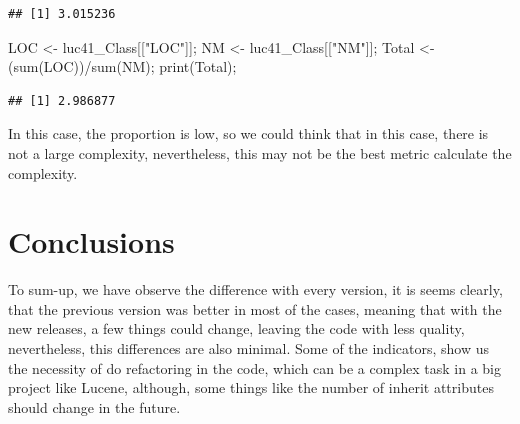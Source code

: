\documentclass[
]{article}
\newenvironment{Shaded}{\begin{snugshade}}{\end{snugshade}}
\newcommand{\FunctionTok}[1]{\textcolor[rgb]{0.00,0.00,0.00}{#1}}
\newcommand{\NormalTok}[1]{#1}
\newcommand{\OtherTok}[1]{\textcolor[rgb]{0.56,0.35,0.01}{#1}}
\newcommand{\SpecialCharTok}[1]{\textcolor[rgb]{0.00,0.00,0.00}{#1}}
\newcommand{\StringTok}[1]{\textcolor[rgb]{0.31,0.60,0.02}{#1}}
\begin{document}
\begin{verbatim}
## [1] 3.015236
\end{verbatim}

\begin{Shaded}
\begin{Highlighting}[]
\NormalTok{LOC }\OtherTok{\textless{}{-}}\NormalTok{ luc41\_Class[[}\StringTok{"LOC"}\NormalTok{]];}
\NormalTok{NM }\OtherTok{\textless{}{-}}\NormalTok{ luc41\_Class[[}\StringTok{"NM"}\NormalTok{]];}
\NormalTok{Total }\OtherTok{\textless{}{-}}\NormalTok{ (}\FunctionTok{sum}\NormalTok{(LOC))}\SpecialCharTok{/}\FunctionTok{sum}\NormalTok{(NM);}
\FunctionTok{print}\NormalTok{(Total);}
\end{Highlighting}
\end{Shaded}

\begin{verbatim}
## [1] 2.986877
\end{verbatim}

In this case, the proportion is low, so we could think that in this
case, there is not a large complexity, nevertheless, this may not be the
best metric calculate the complexity.

\hypertarget{conclusions}{%
\section{Conclusions}\label{conclusions}}

To sum-up, we have observe the difference with every version, it is
seems clearly, that the previous version was better in most of the
cases, meaning that with the new releases, a few things could change,
leaving the code with less quality, nevertheless, this differences are
also minimal. Some of the indicators, show us the necessity of do
refactoring in the code, which can be a complex task in a big project
like Lucene, although, some things like the number of inherit attributes
should change in the future.
\end{document}
